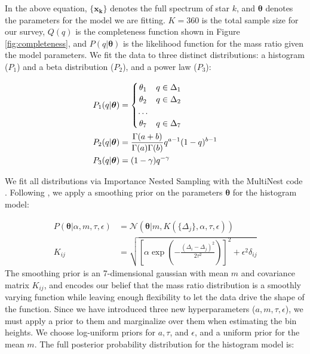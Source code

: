 \documentclass{emulateapj}
\renewcommand{\vec}[1]{\bm{#1}}
\DeclareMathOperator\erf{erf}
\begin{document}
In the above equation, $\{\vec{x_k}\}$ denotes the full spectrum of star $k$, and $\vec{\theta}$ denotes the parameters for the model we are fitting. $K=360$ is the total sample size for our survey, $Q(q)$ is the completeness function shown in Figure \ref{fig:completeness}, and $P(q|\vec{\theta})$ is the likelihood function for the mass ratio given the model parameters. We fit the data to three distinct distributions: a histogram ($P_1$) and a beta distribution ($P_2$), and a power law ($P_3$):

\begin{align}
 P_1(q|\vec{\theta}) &= \begin{cases}
      \hfill \theta_1 \hfill & q \in \Delta_1 \\
      \hfill \theta_2 \hfill & q \in \Delta_2 \\
      \hfill \ldots \\
      \hfill \theta_7 \hfill & q \in \Delta_7
     \end{cases} \label{eqn:P1} \\
 P_2(q|\vec{\theta}) &= \frac{\Gamma(a+b)}{\Gamma(a)\Gamma(b)} q^{a-1}(1-q)^{b-1} \\
 P_3(q|\vec{\theta}) &= (1-\gamma)q^{-\gamma} \label{eqn:P3}
\end{align}


We fit all distributions via Importance Nested Sampling with the MultiNest code \citep{multinest}. Following \citet{Foreman2014}, we apply a smoothing prior on the parameters $\vec{\theta}$ for the histogram model:

\begin{align}
P(\vec{\theta}| \alpha, m, \tau, \epsilon) &= \mathcal{N}(\vec{\theta} | m, K(\{\Delta_j\}, \alpha, \tau, \epsilon)) \\
K_{ij} &= \sqrt{\left[\alpha \exp{\left(-\frac{(\Delta_i - \Delta_j)^2}{2\tau^2}\right)}\right]^2 + \epsilon^2 \delta_{ij}}
\end{align}
The smoothing prior is an 7-dimensional gaussian with mean $m$ and covariance matrix $K_{ij}$, and encodes our belief that the mass ratio distribution is a smoothly varying function while leaving enough flexibility to let the data drive the shape of the function. Since we have introduced three new hyperparameters ($a, m, \tau, \epsilon$), we must apply a prior to them and marginalize over them when estimating the bin heights. We choose log-uniform priors for $a, \tau$, and $\epsilon$, and a uniform prior for the mean $m$. The full posterior probability distribution for the histogram model is:
\end{document}
